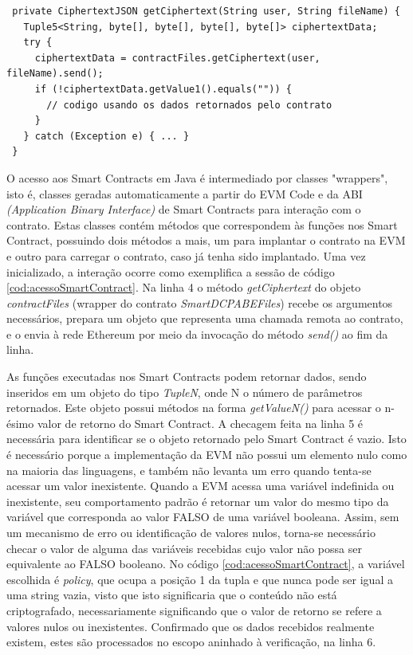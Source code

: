 \documentclass[a4paper,11pt]{article}
\begin{document}


\begin{lstlisting}
 private CiphertextJSON getCiphertext(String user, String fileName) {
   Tuple5<String, byte[], byte[], byte[], byte[]> ciphertextData;
   try {
     ciphertextData = contractFiles.getCiphertext(user, fileName).send();
     if (!ciphertextData.getValue1().equals("")) {
       // codigo usando os dados retornados pelo contrato
     }
   } catch (Exception e) { ... }
 }
\end{lstlisting}

O acesso aos Smart Contracts em Java é intermediado por classes "wrappers", isto é, classes geradas automaticamente a partir do EVM Code e da ABI \emph{(Application Binary Interface)} de Smart Contracts para interação com o contrato.
Estas classes contém métodos que correspondem às funções nos Smart Contract, possuindo dois métodos a mais, um para implantar o contrato na EVM e outro para carregar o contrato, caso já tenha sido implantado.
Uma vez inicializado, a interação ocorre como exemplifica a sessão de código \ref{cod:acessoSmartContract}.
Na linha 4 o método \emph{getCiphertext} do objeto \emph{contractFiles} (wrapper do contrato \emph{SmartDCPABEFiles}) recebe os argumentos necessários, prepara um objeto que representa uma chamada remota ao contrato, e o envia à rede Ethereum por meio da invocação do método \emph{send()} ao fim da linha.

As funções executadas nos Smart Contracts podem retornar dados, sendo inseridos em um objeto do tipo \emph{TupleN}, onde N o número de parâmetros retornados. Este objeto possui métodos na forma \emph{getValueN()} para acessar o n-ésimo valor de retorno do Smart Contract.
A checagem feita na linha 5 é necessária para identificar se o objeto retornado pelo Smart Contract é vazio.
Isto é necessário porque a implementação da EVM não possui um elemento nulo como na maioria das linguagens, e também não levanta um erro quando tenta-se acessar um valor inexistente.
Quando a EVM acessa uma variável indefinida ou inexistente, seu comportamento padrão é retornar um valor do mesmo tipo da variável que corresponda ao valor FALSO de uma variável booleana.
Assim, sem um mecanismo de erro ou identificação de valores nulos, torna-se necessário checar o valor de alguma das variáveis recebidas cujo valor não possa ser equivalente ao FALSO booleano.
No código \ref{cod:acessoSmartContract}, a variável escolhida é \emph{policy}, que ocupa a posição 1 da tupla e que nunca pode ser igual a uma string vazia, visto que isto significaria que o conteúdo não está criptografado, necessariamente significando que o valor de retorno se refere a valores nulos ou inexistentes.
Confirmado que os dados recebidos realmente existem, estes são processados no escopo aninhado à verificação, na linha 6.
\end{document}
